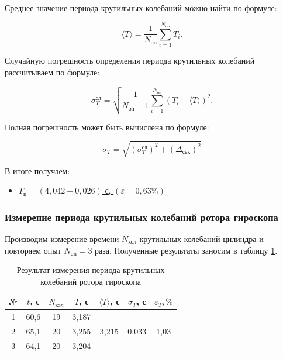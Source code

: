 \documentclass[a4paper,12pt]{article} %
\begin{document}
Среднее значение периода крутильных колебаний можно найти по формуле:

\begin{equation}
\langle T \rangle = \frac{1}{N_\text{оп}}\sum_{i = 1}^{N_\text{оп}} T_i.
\end{equation}

Случайную погрешность определения периода крутильных колебаний рассчитываем по формуле:

\begin{equation}
\sigma^{\text{сл}}_T = \sqrt{\frac{1}{N_\text{оп} - 1} \sum_{i = 1}^{N_\text{оп}} \left(T_i - \langle T \rangle \right)^2}.
\end{equation}

Полная погрешность может быть вычислена по формуле:

\begin{equation}
\sigma_T = \sqrt{\left( \sigma^\text{сл}_T \right)^2 + \left( \Delta_\text{сек} \right)^2  }
\end{equation}

В итоге получаем:

\begin{itemize}
	\item \underline{$ T_\text{ц} = \left( 4,042 \pm 0,026\right) $ с, $ \left(\varepsilon = 0,63 \% \right)  $}
\end{itemize}

\subsubsection{Измерение периода крутильных колебаний ротора гироскопа}

Производим измерение времени $ N_\text{кол} $ крутильных колебаний цилиндра и повторяем опыт $ N_\text{оп} = 3 $ раза. Полученные результаты заносим в таблицу \ref{krut_gir}.


\begin{table}[H]
	\centering
	\begin{tabular}{|c|c|c|c|c|c|c|}
		\hline
		№ & $ t $, с & $ N_\text{кол} $ & $ T $, с & $ \langle T \rangle $, с                & $ \sigma_T $, с             & $ \varepsilon_T , \%$                 \\ \hline
		1 & 60,6 & 19              & 3,187     & \multirow{3}{*}{3,215} & \multirow{3}{*}{0,033} & \multirow{3}{*}{1,03} \\ \cline{1-4}
		2 & 65,1 & 20              & 3,255     &                        &                        &                       \\ \cline{1-4}
		3 & 64,1 & 20              & 3,204     &                        &                        &                       \\ \hline
	\end{tabular}
	\caption{Результат измерения периода крутильных колебаний ротора гироскопа}
	\label{krut_gir}
\end{table}
\end{document}
